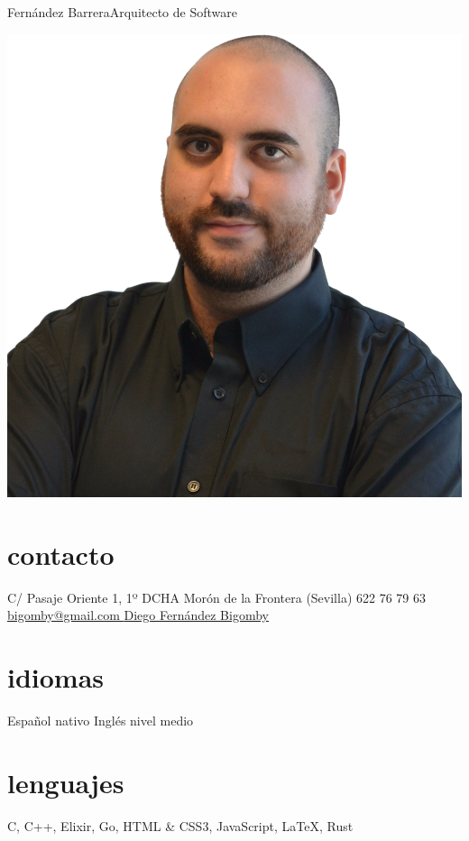 \documentclass[hidelinks]{friggeri-cv} %
\begin{document}
 {Fernández Barrera}{Arquitecto de Software}


\begin{aside} %
 \includegraphics[width=\textwidth]{images/photo.png}
 \section{contacto}
 C/ Pasaje Oriente 1, 1º DCHA
 Morón de la Frontera (Sevilla)
 \mbox{}
 \faPhone\hspace{0.1em} 622 76 79 63
 \mbox{}
 \href{mailto:bigomby@gmail.com}{bigomby@gmail.com \hspace{0.1em} \faEnvelope }
 \href{http://linkd.in/1wwkBZE}{Diego Fernández \hspace{0.1em} \faLinkedin}
 \href{http://bit.ly/1ySLWLv}{Bigomby \hspace{0.1em} \faGithub}
 \section{idiomas}
 Español nativo
 Inglés nivel medio
 \section{lenguajes}
 {C, C++, Elixir, Go, HTML \& CSS3, JavaScript, \LaTeX, Rust}
\end{aside}
\end{document}
